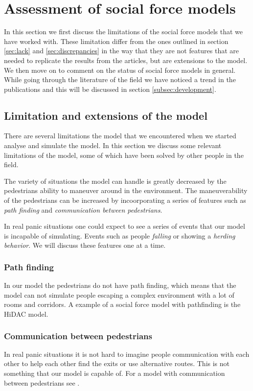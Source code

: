 \section{Assessment of social force models}
\label{sec:assessment}
In this section we first discuss the limitations of the social force models 
that we have worked with. These limitation differ from the ones outlined in 
section \ref{sec:lack} and \ref{sec:discrepancies} in the way that 
they are not features that are needed to replicate the results from the articles, 
but are extensions to the model. We then move on to comment on the status of 
social force models in general.
While going through the literature of the field we have noticed a trend in the 
publications and this will be discussed in section \ref{subsec:development}.

\subsection{Limitation and extensions of the model}
There are several limitations the model that we encountered when we started 
analyse and simulate the model. In this section we discuss some relevant 
limitations of the model, some of which have been solved by other people in the 
field. 

The variety of situations the model can handle is greatly decreased by the 
pedestrians ability to maneuver around in the environment. The maneuverability of 
the pedestrians can be increased by incoorporating a series of features such as 
\emph{path finding} and \emph{communication between pedestrians}. 

In real panic situations one could expect to see a series of events that our 
model is incapable of simulating. Events such as people \emph{falling} or showing a 
\emph{herding behavior}. We will discuss these features one at a time.

\subsubsection{Path finding}
In our model the pedestrians do not have path finding, which means that the model 
can not simulate people escaping a complex environment with a lot of rooms 
and corridors. A example of a social force model with pathfinding is the HiDAC 
model\cite{HiDAC}.

\subsubsection{Communication between pedestrians}
In real panic situations it is not hard to imagine people communication with 
each other to help each other find the exits or use alternative routes. This is 
not something that our model is capable of. For a model with communication between 
pedestrians see \cite{HiDAC}.

